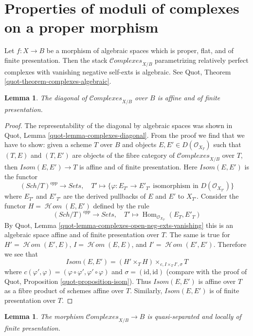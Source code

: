 \documentclass{stacks-project}
\theoremstyle{plain}
\newtheorem{lemma}[subsection]{Lemma}
\theoremstyle{definition}
\theoremstyle{remark}
\numberwithin{equation}{subsection}
\def\Hom{\mathop{\mathrm{Hom}}\nolimits}
\def\SheafHom{\mathop{\mathcal{H}\!\mathit{om}}\nolimits}
\def\Sch{\mathit{Sch}}
\def\Complexesstack{\mathcal{C}\!\mathit{omplexes}}
\begin{document}
\section{Properties of moduli of complexes on a proper morphism}
\label{section-complexes}

\noindent
Let $f : X \to B$ be a morphism of algebraic spaces which is proper,
flat, and of finite presentation. Then the stack
$\Complexesstack_{X/B}$ parametrizing relatively perfect complexes
with vanishing negative self-exts is algebraic. See
Quot, Theorem \ref{quot-theorem-complexes-algebraic}.

\begin{lemma}
\label{lemma-complexes-diagonal-affine-fp}
The diagonal of $\Complexesstack_{X/B}$ over $B$ is affine
and of finite presentation.
\end{lemma}

\begin{proof}
The representability of the diagonal by algebraic spaces
was shown in Quot, Lemma \ref{quot-lemma-complexes-diagonal}.
From the proof we find that we have to show:
given a scheme $T$ over $B$ and objects
$E, E' \in D(\mathcal{O}_{X_T})$ such that
$(T, E)$ and $(T, E')$ are objects of the fibre category
of $\Complexesstack_{X/B}$ over $T$, then
$\mathit{Isom}(E, E') \to T$
is affine and of finite presentation.
Here $\mathit{Isom}(E, E')$ is the functor
$$
(\Sch/T)^{opp} \to \textit{Sets},\quad
T' \mapsto \{\varphi : E_{T'} \to E'_{T'}
\text{ isomorphism in }D(\mathcal{O}_{X_{T'}})\}
$$
where $E_{T'}$ and $E'_{T'}$ are the derived pullbacks of $E$ and $E'$
to $X_{T'}$. Consider the functor $H = \SheafHom(E, E')$ defined
by the rule
$$
(\Sch/T)^{opp} \to \textit{Sets},\quad
T' \mapsto \Hom_{\mathcal{O}_{X_{T'}}}(E_T, E'_T)
$$
By Quot, Lemma \ref{quot-lemma-complexes-open-neg-exts-vanishing}
this is an algebraic space affine and of finite presentation over $T$.
The same is true for $H' = \SheafHom(E', E)$, $I = \SheafHom(E, E)$, and
$I' = \SheafHom(E', E')$. Therefore we see that
$$
\mathit{Isom}(E, E') = (H' \times_T H) \times_{c, I \times_T I', \sigma} T
$$
where $c(\varphi', \varphi) = (\varphi \circ \varphi', \varphi' \circ \varphi)$
and $\sigma = (\text{id}, \text{id})$ (compare with the proof of
Quot, Proposition \ref{quot-proposition-isom}). Thus
$\mathit{Isom}(E, E')$ is affine over $T$ as a fibre product of
schemes affine over $T$. Similarly, $\mathit{Isom}(E, E')$ is
of finite presentation over $T$.
\end{proof}

\begin{lemma}
\label{lemma-complexes-qs-lfp}
The morphism $\Complexesstack_{X/B} \to B$ is quasi-separated and
locally of finite presentation.
\end{lemma}
\end{document}
